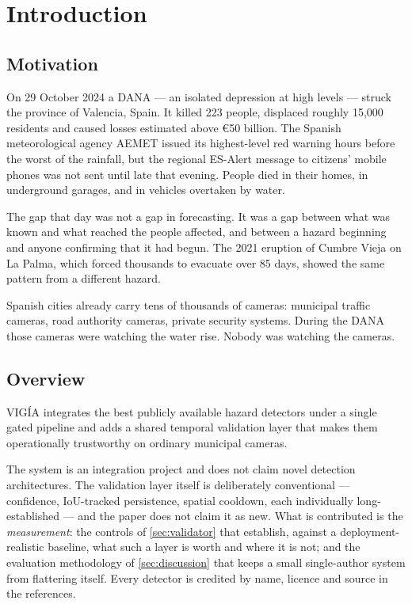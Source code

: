 \section{Introduction}
\label{sec:introduction}

\subsection{Motivation}

On 29 October 2024 a DANA — an isolated depression at high levels — struck the
province of Valencia, Spain. It killed 223 people, displaced roughly 15{,}000
residents and caused losses estimated above €50 billion. The Spanish
meteorological agency AEMET issued its highest-level red warning hours before
the worst of the rainfall, but the regional ES-Alert message to citizens'
mobile phones was not sent until late that evening. People died in their
homes, in underground garages, and in vehicles overtaken by water.

The gap that day was not a gap in forecasting. It was a gap between what was
known and what reached the people affected, and between a hazard beginning and
anyone confirming that it had begun. The 2021 eruption of Cumbre Vieja on La
Palma, which forced thousands to evacuate over 85 days, showed the same
pattern from a different hazard.

Spanish cities already carry tens of thousands of cameras: municipal traffic
cameras, road authority cameras, private security systems. During the DANA
those cameras were watching the water rise. Nobody was watching the cameras.

\subsection{Overview}

VIGÍA integrates the best publicly available hazard detectors under a single
gated pipeline and adds a shared temporal validation layer that makes them
operationally trustworthy on ordinary municipal cameras.

The system is an integration project and does not claim novel detection
architectures. The validation layer itself is deliberately conventional —
confidence, IoU-tracked persistence, spatial cooldown, each individually
long-established — and the paper does not claim it as new. What is contributed
is the \emph{measurement}: the controls of \cref{sec:validator} that
establish, against a deployment-realistic baseline, what such a layer is
worth and where it is not; and the evaluation methodology of
\cref{sec:discussion} that keeps a small single-author system from
flattering itself. Every detector is credited by name, licence and source in
the references.

